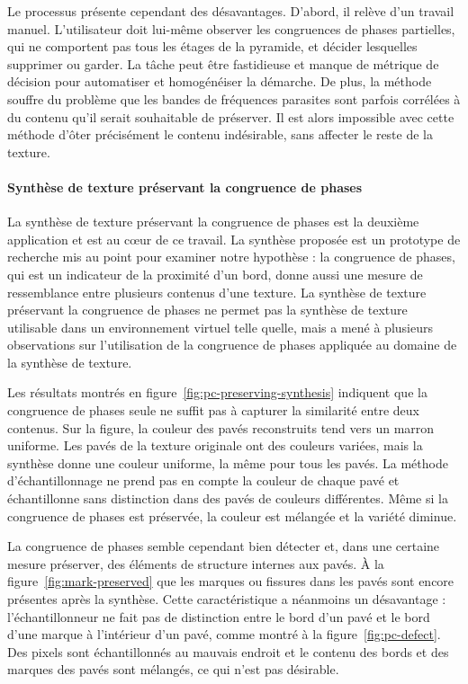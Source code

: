 \bigskip

Le processus présente cependant des désavantages. D'abord, il relève d'un travail manuel. L'utilisateur doit lui-même observer les congruences de phases partielles, qui ne comportent pas tous les étages de la pyramide, et décider lesquelles supprimer ou garder. La tâche peut être fastidieuse et manque de métrique de décision pour automatiser et homogénéiser la démarche. De plus, la méthode souffre du problème que les bandes de fréquences parasites sont parfois corrélées à du contenu qu'il serait souhaitable de préserver. Il est alors impossible avec cette méthode d'ôter précisément le contenu indésirable, sans affecter le reste de la texture.

\paragraph{Synthèse de texture préservant la congruence de phases}
\label{par:discussion-synthesis}

La synthèse de texture préservant la congruence de phases est la deuxième application et est au cœur de ce travail. La synthèse proposée est un prototype de recherche mis au point pour examiner notre hypothèse : la congruence de phases, qui est un indicateur de la proximité d'un bord, donne aussi une mesure de ressemblance entre plusieurs contenus d'une texture. La synthèse de texture préservant la congruence de phases ne permet pas la synthèse de texture utilisable dans un environnement virtuel telle quelle, mais a mené à plusieurs observations sur l'utilisation de la congruence de phases appliquée au domaine de la synthèse de texture.

\bigskip

Les résultats montrés en figure~\ref{fig:pc-preserving-synthesis} indiquent que la congruence de phases seule ne suffit pas à capturer la similarité entre deux contenus. Sur la figure, la couleur des pavés reconstruits tend vers un marron uniforme. Les pavés de la texture originale ont des couleurs variées, mais la synthèse donne une couleur uniforme, la même pour tous les pavés. La méthode d'échantillonnage ne prend pas en compte la couleur de chaque pavé et échantillonne sans distinction dans des pavés de couleurs différentes. Même si la congruence de phases est préservée, la couleur est mélangée et la variété diminue.

\bigskip

La congruence de phases semble cependant bien détecter et, dans une certaine mesure préserver, des éléments de structure internes aux pavés. À la figure~\ref{fig:mark-preserved} que les marques ou fissures dans les pavés sont encore présentes après la synthèse. Cette caractéristique a néanmoins un désavantage : l'échantillonneur ne fait pas de distinction entre le bord d'un pavé et le bord d'une marque à l'intérieur d'un pavé, comme montré à la figure~\ref{fig:pc-defect}. Des pixels sont échantillonnés au mauvais endroit et le contenu des bords et des marques des pavés sont mélangés, ce qui n'est pas désirable.

